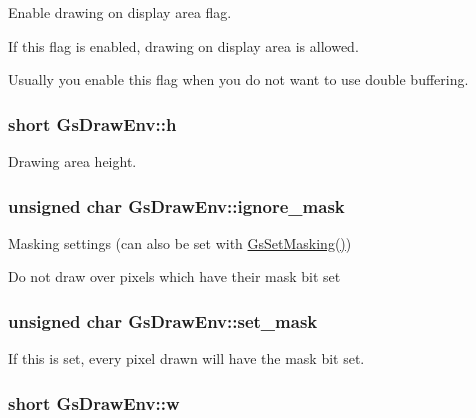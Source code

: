 Enable drawing on display area flag. 

If this flag is enabled, drawing on display area is allowed.

Usually you enable this flag when you do not want to use double buffering. \hypertarget{structGsDrawEnv_a010f8d7cc07b6287f3b5cc33c772bbec}{}
\subsubsection[{h}]{\setlength{\rightskip}{0pt plus 5cm}short Gs\+Draw\+Env\+::h}\label{structGsDrawEnv_a010f8d7cc07b6287f3b5cc33c772bbec}


Drawing area height. 

\hypertarget{structGsDrawEnv_a4702f6a0dc9e014fffc7c83a5d94dda2}{}
\subsubsection[{ignore\+\_\+mask}]{\setlength{\rightskip}{0pt plus 5cm}unsigned char Gs\+Draw\+Env\+::ignore\+\_\+mask}\label{structGsDrawEnv_a4702f6a0dc9e014fffc7c83a5d94dda2}


Masking settings (can also be set with \hyperlink{psxgpu_8h_a3227c6006b054de313ff717ee00d8314}{Gs\+Set\+Masking()}) 

Do not draw over pixels which have their mask bit set \hypertarget{structGsDrawEnv_a9c7f33c1da333d45f478dc9eb77bf0a1}{}
\subsubsection[{set\+\_\+mask}]{\setlength{\rightskip}{0pt plus 5cm}unsigned char Gs\+Draw\+Env\+::set\+\_\+mask}\label{structGsDrawEnv_a9c7f33c1da333d45f478dc9eb77bf0a1}


If this is set, every pixel drawn will have the mask bit set. 

\hypertarget{structGsDrawEnv_a1a0cd2e7dc81367a7020044f4552b3f5}{}
\subsubsection[{w}]{\setlength{\rightskip}{0pt plus 5cm}short Gs\+Draw\+Env\+::w}\label{structGsDrawEnv_a1a0cd2e7dc81367a7020044f4552b3f5}


